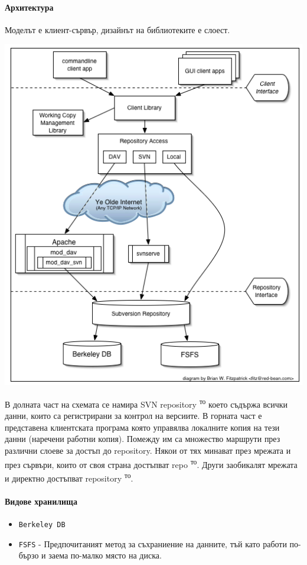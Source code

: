 \documentclass[a4paper]{article}
\begin{document}
    \paragraph{Архитектура}
    Моделът е клиент-сървър, дизайнът на библиотеките е слоест.

    \includegraphics[scale=0.5]{svn_architecture}

    В долната част на схемата се намира SVN repository \textsuperscript{то} което съдържа всички данни, които са регистрирани за контрол на версиите. В горната част е представена клиентската програма която управялва локалните копия на тези данни (наречени работни копия). Помежду им са множество маршрути през различни слоеве за достъп до repository. Някои от тях минават през мрежата и през сървъри, които от своя страна достъпват repo \textsuperscript{то}. Други заобикалят мрежата и директно достъпват repository \textsuperscript{то}. 

    \paragraph{Видове хранилища}

    \begin{itemize}
      \item \texttt{Berkeley DB}
      \item \texttt{FSFS} - Предпочитаният метод за съхраниение на данните, тъй като работи по-бързо и заема по-малко място на диска.
    \end{itemize}
\end{document}
